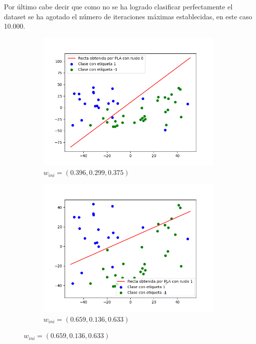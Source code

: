\documentclass[12pt,a4paper]{article}
\begin{document}
Por último cabe decir que como no se ha logrado clasificar perfectamente el dataset se ha agotado el número de iteraciones máximas establecidas, en este caso 10.000.

\begin{figure}[H]
	\centering
	\begin{subfigure}{0.32\textwidth}
		\includegraphics[scale=0.37]{./Imagenes/ej2-13.png}
		\caption{$w_{ini} = (0.396,0.299,0.375)$}
	\end{subfigure}
	\begin{subfigure}{0.33\textwidth}
		\includegraphics[scale=0.37]{./Imagenes/ej2-14.png}
		\caption{$w_{ini} = (0.659,0.136,0.633)$}
	\end{subfigure}

\end{figure}
\end{document}
